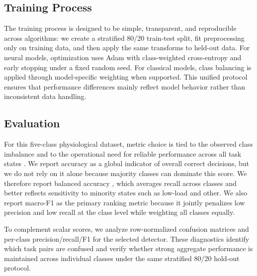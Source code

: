 \documentclass{llncs}
\begin{document}
\subsection{Training Process}
The training process is designed to be simple, transparent, and reproducible across algorithms: we create a stratified 80/20 train-test split, fit preprocessing only on training data, and then apply the same transforms to held-out data. For neural models, optimization uses Adam with class-weighted cross-entropy and early stopping under a fixed random seed. For classical models, class balancing is applied through model-specific weighting when supported. This unified protocol ensures that performance differences mainly reflect model behavior rather than inconsistent data handling.


\subsection{Evaluation}
For this five-class physiological dataset, metric choice is tied to the observed class imbalance and to the operational need for reliable performance across all task states \cite{jeni2023imbalanced}. We report accuracy as a global indicator of overall correct decisions, but we do not rely on it alone because majority classes can dominate this score. We therefore report balanced accuracy \cite{brodersen2010biostatistics}, which averages recall across classes and better reflects sensitivity to minority states such as low-load and other. We also report macro-F1 \cite{sokolova2009systematic} as the primary ranking metric because it jointly penalizes low precision and low recall at the class level while weighting all classes equally.

To complement scalar scores, we analyze row-normalized confusion matrices and per-class precision/recall/F1 for the selected detector. These diagnostics identify which task pairs are confused and verify whether strong aggregate performance is maintained across individual classes under the same stratified 80/20 hold-out protocol.
\end{document}
